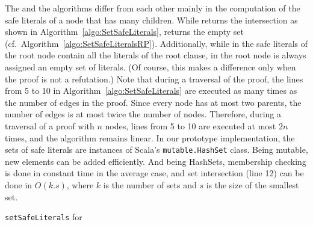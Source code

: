 The {\RPI} and the {\RPI} algorithms differ from each other mainly in the
computation of the safe literals of a node that has many children. While {\RPI}
returns the intersection as shown in Algorithm~\ref{algo:SetSafeLiterals}, {\RPI}
returns the empty set (cf.\ Algorithm~\ref{algo:SetSafeLiteralsRP}). Additionally, while in {\RPI} the safe literals of the root node contain all the literals of the root clause, in {\RPI} the root node is always assigned an empty set of literals. 
(Of course, this makes a difference only when the proof is not a refutation.)
Note that during a traversal of the proof, 
the lines from 5 to 10 in Algorithm~\ref{algo:SetSafeLiterals} are executed as many times as the number of edges in the proof. 
Since every node has at most two parents, the number of edges is at most twice the number of nodes. 
Therefore, during a traversal of a proof with $n$ nodes, lines from 5 to 10 are
executed at most $2n$ times, and the algorithm remains linear.
In our prototype implementation, the sets of safe literals are instances of Scala's 
\texttt{mutable.HashSet} class. Being mutable, new elements can be added efficiently.
And being HashSets, membership checking is done in constant time in the average case, 
and set intersection (line 12) can be done in $O(k.s)$, where $k$ is the number of sets and $s$ is the size of the smallest set.


\begin{algorithm}[t]
\begin{footnotesize}



\BlankLine

\caption{\label{algo:SetSafeLiteralsRP} \texttt{setSafeLiterals} for }
\end{footnotesize}
\end{algorithm}


\begin{example}
\end{example}



